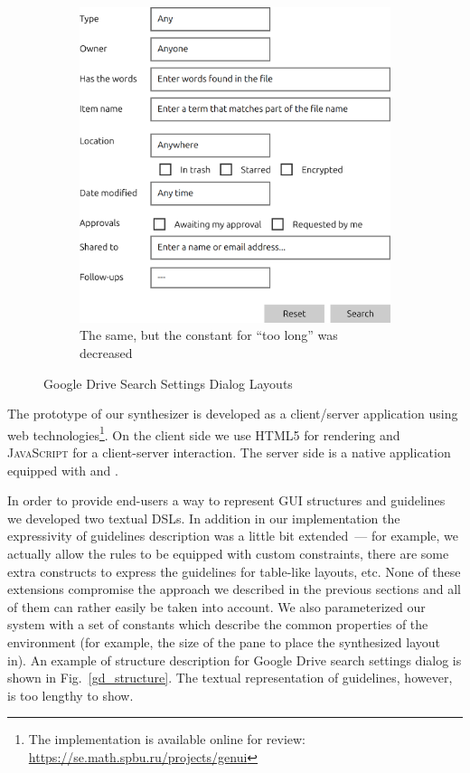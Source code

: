 \begin{figure}[t]
\begin{subfigure}[t]{.45\textwidth}
    \end{subfigure}\hspace{1cm}
    \begin{subfigure}[t]{.45\textwidth}
      \centering
      \includegraphics[scale=0.25]{google-drive-search-setting-output3.png}
      \caption{The same, but the constant for ``too long'' was decreased}
    \end{subfigure}
    \caption{Google Drive Search Settings Dialog Layouts}
    \label{fig:QMLtwoGuidelines}
\end{figure}

The prototype of our synthesizer is developed as a \mbox{client}/server application using web technologies\footnote{The implementation is available online
for review: \url{https://se.math.spbu.ru/projects/genui}}.
On the client side we use \textsc{HTML5} for rendering and \textsc{JavaScript} for a client-server interaction. 
The server side is a native \OCaml{} application equipped with \OCanren{} and \Zthree{}.

In order to provide end-users a way to represent GUI structures and guidelines we developed two textual DSLs. In addition in our implementation
the expressivity of guidelines description was a little bit extended~--- for example, we actually allow the rules to be equipped with custom constraints, there are
some extra constructs to express the guidelines for table-like layouts, etc. None of these extensions compromise the approach we
described in the previous sections and all of them can rather easily be taken into account. We also parameterized our system with
a set of constants which describe the common properties of the environment (for example, the size of the pane to place the synthesized layout in).
An example of structure description for Google Drive search settings dialog is shown in Fig.~\ref{gd_structure}.
The textual representation of guidelines, however, is too lengthy to show.


